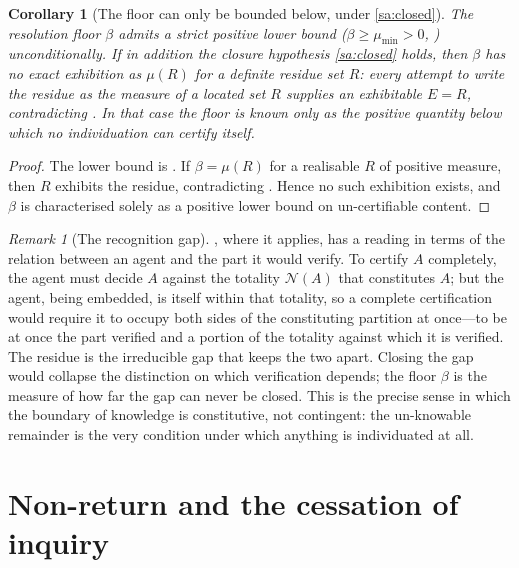 \documentclass[11pt,a4paper]{article}
\theoremstyle{thmstyle}
\newtheorem{corollary}[theorem]{Corollary}
\theoremstyle{definition}
\theoremstyle{remark}
\newtheorem{remark}[theorem]{Remark}
\newcommand{\thick}{\beta}
\newcommand{\Neg}{\mathcal{N}}
\begin{document}
\begin{corollary}[The floor can only be bounded below, under \ref{sa:closed}]
\label{cor:floor-only-bounded}
The resolution floor $\thick$ admits a strict positive lower bound
\textup{(}$\thick\ge\mu_{\min}>0$, \textup{)}
unconditionally. If in addition the closure hypothesis \ref{sa:closed} holds,
then $\thick$ has no exact exhibition as $\mu(R)$ for a definite residue set $R$:
every attempt to write the residue as the measure of a located set $R$ supplies
an exhibitable $E=R$, contradicting . In that case
the floor is known only as the positive quantity below which no individuation can
certify itself.
\end{corollary}

\begin{proof}
The lower bound is . If $\thick=\mu(R)$ for a realisable $R$
of positive measure, then $R$ exhibits the residue, contradicting
. Hence no such exhibition exists, and $\thick$ is
characterised solely as a positive lower bound on un-certifiable content.
\end{proof}

\begin{remark}[The recognition gap]
\label{rem:recognition-gap}
, where it applies, has a reading in terms of the
relation between an agent and the part it would verify. To certify $A$ completely, the agent must
decide $A$ against the totality $\Neg(A)$ that constitutes $A$; but the agent,
being embedded, is itself within that totality, so a complete certification would
require it to occupy both sides of the constituting partition at once---to be at
once the part verified and a portion of the totality against which it is
verified. The residue is the irreducible gap that keeps the two apart. Closing
the gap would collapse the distinction on which verification depends; the floor
$\thick$ is the measure of how far the gap can never be closed. This is the
precise sense in which the boundary of knowledge is constitutive, not contingent:
the un-knowable remainder is the very condition under which anything is
individuated at all.
\end{remark}


\section{Non-return and the cessation of inquiry}
\label{sec:inquiry}
\end{document}
